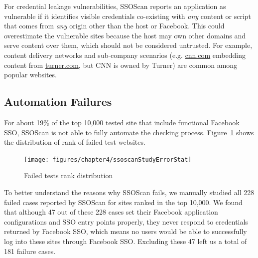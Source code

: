  For credential leakage vulnerabilities, SSOScan reports an application as vulnerable if it identifies visible credentials co-existing with \emph{any} content or script that comes from \emph{any} origin other than the host or Facebook.  This could overestimate the vulnerable sites because the host may own other domains and serve content over them, which should not be considered untrusted.  For example, content delivery networks and sub-company scenarios (e.g. \url{cnn.com} embedding content from \url{turner.com}, but CNN is owned by Turner) are common among popular websites.

\subsection{Automation Failures}
\label{sec:ssoscanStudyAutomationFailReasons}

For about 19\% of the top 10,000 tested site that include functional Facebook SSO, SSOScan is not able to fully automate the checking process.  Figure~\ref{fig:ssoscanStudyErrorStat} shows the distribution of rank of failed test websites.

\begin{figure}[hbt]
\centering
\texttt{[image: figures/chapter4/ssoscanStudyErrorStat]}
\caption{Failed tests rank distribution}
\label{fig:ssoscanStudyErrorStat}
\end{figure}

To better understand the reasons why SSOScan fails, we manually studied all 228 failed cases reported by SSOScan for sites ranked in the top 10,000.  We found that although 47 out of these 228 cases set their Facebook application configurations and SSO entry points properly, they never respond to credentials returned by Facebook SSO, which means no users would be able to successfully log into these sites through Facebook SSO.  Excluding these 47 left us a total of 181 failure cases.

